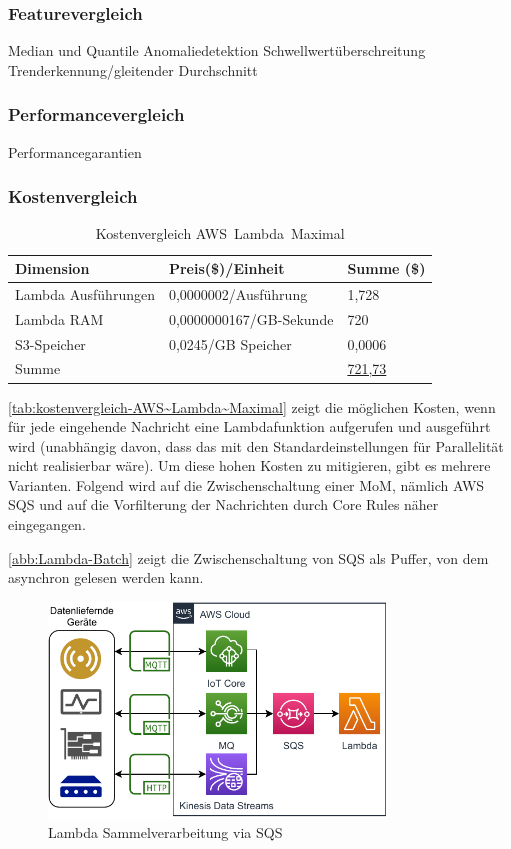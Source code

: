 \subsubsection{Featurevergleich}
Median und Quantile
Anomaliedetektion
Schwellwertüberschreitung
Trenderkennung/gleitender Durchschnitt

\subsubsection{Performancevergleich}
Performancegarantien

\subsubsection{Kostenvergleich}
\begin{table}[H]
\centering
\begin{tabular}{|l|l|l|}
\hline
Dimension & Preis(\$)/Einheit & Summe (\$) \\ \hline
Lambda Ausführungen & 0,0000002/Ausführung & 1,728 \\ \hline
Lambda \ac{RAM} & 0,0000000167/GB-Sekunde & 720 \\ \hline
\ac{S3}-Speicher & 0,0245/GB Speicher & 0,0006 \\ \hline
Summe & \cellcolor[HTML]{EFEFEF} & \underline{721,73} \\ \hline
\end{tabular}
\caption{Kostenvergleich AWS~Lambda~Maximal}
\label{tab:kostenvergleich-AWS~Lambda~Maximal}
\end{table}

\autoref{tab:kostenvergleich-AWS~Lambda~Maximal} zeigt die möglichen Kosten, wenn für jede eingehende Nachricht eine Lambdafunktion aufgerufen und ausgeführt wird (unabhängig davon, dass das mit den Standardeinstellungen für Parallelität nicht realisierbar wäre). Um diese hohen Kosten zu mitigieren, gibt es mehrere Varianten. Folgend wird auf die Zwischenschaltung einer \ac{MoM}, nämlich \ac{AWS} \ac{SQS} und auf die Vorfilterung der Nachrichten durch \AWSIOT{} Core Rules näher eingegangen.

\autoref{abb:Lambda-Batch} zeigt die Zwischenschaltung von \ac{SQS} als Puffer, von dem asynchron gelesen werden kann.

\begin{figure}[H]
\centering
\includegraphics[width=0.8\textwidth]{graphics/Lambda-Batch.pdf}
\caption{Lambda Sammelverarbeitung via SQS}
\label{abb:Lambda-Batch}
\end{figure}

